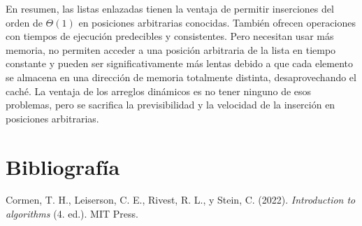 En resumen, las listas enlazadas tienen la ventaja de permitir inserciones del orden de $\Theta{}(1)$ en posiciones arbitrarias conocidas. También ofrecen operaciones con tiempos de ejecución predecibles y consistentes. Pero necesitan usar más memoria, no permiten acceder a una posición arbitraria de la lista en tiempo constante y pueden ser significativamente más lentas debido a que cada elemento se almacena en una dirección de memoria totalmente distinta, desaprovechando el caché. La ventaja de los arreglos dinámicos es no tener ninguno de esos problemas, pero se sacrifica la previsibilidad y la velocidad de la inserción en posiciones arbitrarias.

\section*{Bibliografía}

Cormen, T. H., Leiserson, C. E., Rivest, R. L., y Stein, C. (2022). \textit{Introduction to algorithms} (4.\textordfeminine{} ed.). MIT Press.
